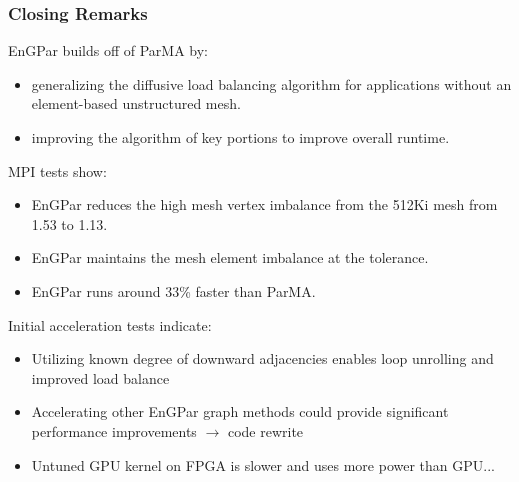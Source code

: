 \documentclass{beamer}
\begin{document}
\begin{frame}
  \frametitle{Closing Remarks}
  EnGPar builds off of ParMA by:
  \begin {itemize}
  \item generalizing the diffusive load balancing algorithm for applications without an element-based unstructured mesh.
  \item improving the algorithm of key portions to improve overall runtime.
  \end{itemize}
  MPI tests show:
  \begin {itemize}
  \item EnGPar reduces the high mesh vertex imbalance from the 512Ki mesh from 1.53 to 1.13.
  \item EnGPar maintains the mesh element imbalance at the tolerance.
  \item EnGPar runs around 33\% faster than ParMA.
  \end{itemize}
  Initial acceleration tests indicate:
  \begin {itemize}
  \item Utilizing known degree of downward adjacencies enables
    loop unrolling and improved load balance
  \item Accelerating other EnGPar graph methods could provide significant performance
    improvements $\rightarrow$ code rewrite
  \item Untuned GPU kernel on FPGA is slower and uses more power than GPU...
  \end{itemize}
\end{frame}
\end{document}
